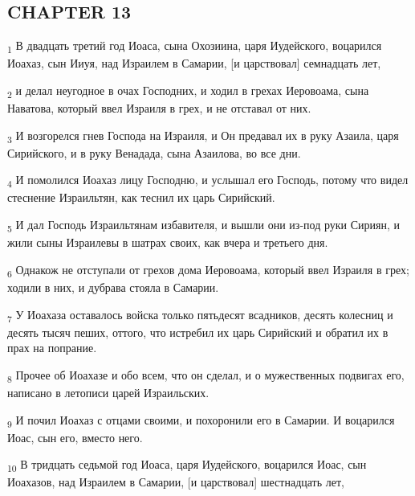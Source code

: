 \subsection{CHAPTER 13}
\begin{tcolorbox}
\textsubscript{1} В двадцать третий год Иоаса, сына Охозиина, царя Иудейского, воцарился Иоахаз, сын Ииуя, над Израилем в Самарии, [и царствовал] семнадцать лет,
\end{tcolorbox}
\begin{tcolorbox}
\textsubscript{2} и делал неугодное в очах Господних, и ходил в грехах Иеровоама, сына Наватова, который ввел Израиля в грех, и не отставал от них.
\end{tcolorbox}
\begin{tcolorbox}
\textsubscript{3} И возгорелся гнев Господа на Израиля, и Он предавал их в руку Азаила, царя Сирийского, и в руку Венадада, сына Азаилова, во все дни.
\end{tcolorbox}
\begin{tcolorbox}
\textsubscript{4} И помолился Иоахаз лицу Господню, и услышал его Господь, потому что видел стеснение Израильтян, как теснил их царь Сирийский.
\end{tcolorbox}
\begin{tcolorbox}
\textsubscript{5} И дал Господь Израильтянам избавителя, и вышли они из-под руки Сириян, и жили сыны Израилевы в шатрах своих, как вчера и третьего дня.
\end{tcolorbox}
\begin{tcolorbox}
\textsubscript{6} Однакож не отступали от грехов дома Иеровоама, который ввел Израиля в грех; ходили в них, и дубрава стояла в Самарии.
\end{tcolorbox}
\begin{tcolorbox}
\textsubscript{7} У Иоахаза оставалось войска только пятьдесят всадников, десять колесниц и десять тысяч пеших, оттого, что истребил их царь Сирийский и обратил их в прах на попрание.
\end{tcolorbox}
\begin{tcolorbox}
\textsubscript{8} Прочее об Иоахазе и обо всем, что он сделал, и о мужественных подвигах его, написано в летописи царей Израильских.
\end{tcolorbox}
\begin{tcolorbox}
\textsubscript{9} И почил Иоахаз с отцами своими, и похоронили его в Самарии. И воцарился Иоас, сын его, вместо него.
\end{tcolorbox}
\begin{tcolorbox}
\textsubscript{10} В тридцать седьмой год Иоаса, царя Иудейского, воцарился Иоас, сын Иоахазов, над Израилем в Самарии, [и царствовал] шестнадцать лет,
\end{tcolorbox}

